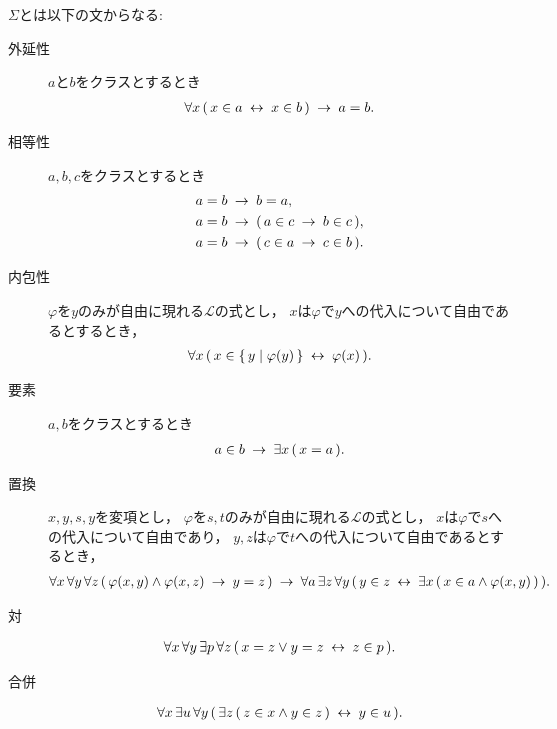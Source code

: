 	$\Sigma$とは以下の文からなる:
	\begin{description}
		\item[外延性] $a$と$b$をクラスとするとき
			\begin{align}
				\forall x\, (\, x \in a \hspace{0.25em}\leftrightarrow\hspace{0.25em} x \in b\, ) \hspace{0.25em}\rightarrow\hspace{0.25em} a = b.
			\end{align}
			
		\item[相等性] $a,b,c$をクラスとするとき
			\begin{align}
				a = b &\hspace{0.25em}\rightarrow\hspace{0.25em} b = a, \\
				a = b &\hspace{0.25em}\rightarrow\hspace{0.25em} (\, a \in c \hspace{0.25em}\rightarrow\hspace{0.25em} b \in c\, ), \\
				a = b &\hspace{0.25em}\rightarrow\hspace{0.25em} (\, c \in a \hspace{0.25em}\rightarrow\hspace{0.25em} c \in b\, ).
			\end{align}
		
		\item[内包性] $\varphi$を$y$のみが自由に現れる$\mathcal{L}$の式とし，
			$x$は$\varphi$で$y$への代入について自由であるとするとき，
			\begin{align}
				\forall x\, (\, x \in \{\, y \mid \varphi(y)\, \} \hspace{0.25em}\leftrightarrow\hspace{0.25em} \varphi(x)\, ).
			\end{align}
		
		\item[要素] $a,b$をクラスとするとき
			\begin{align}
				a \in b \hspace{0.25em}\rightarrow\hspace{0.25em} \exists x\, (\, x = a\, ).
			\end{align}
		
		\item[置換] $x,y,s,y$を変項とし，
			$\varphi$を$s,t$のみが自由に現れる$\mathcal{L}$の式とし，
			$x$は$\varphi$で$s$への代入について自由であり，
			$y,z$は$\varphi$で$t$への代入について自由であるとするとき，
			\begin{align}
				\forall x\, \forall y\, \forall z\, 
				(\, \varphi(x,y) \wedge \varphi(x,z)
				\hspace{0.25em}\rightarrow\hspace{0.25em} y = z\, )
				\hspace{0.25em}\rightarrow\hspace{0.25em} \forall a\, \exists z\, \forall y\,
				(\, y \in z \hspace{0.25em}\leftrightarrow\hspace{0.25em} \exists x\, (\, x \in a \wedge 
				\varphi(x,y)\, )\, ).
			\end{align}
			
		\item[対] 
			\begin{align}
				\forall x\, \forall y\, \exists p\, \forall z\, 
				(\, x = z \vee y = z \hspace{0.25em}\leftrightarrow\hspace{0.25em} z \in p\, ).
			\end{align}
			
		\item[合併] 
			\begin{align}
				\forall x\, \exists u\, \forall y\, (\, \exists z\, (\, z \in x \wedge y \in z\, ) \hspace{0.25em}\leftrightarrow\hspace{0.25em} y \in u\, ).
			\end{align}
			

\end{description}

